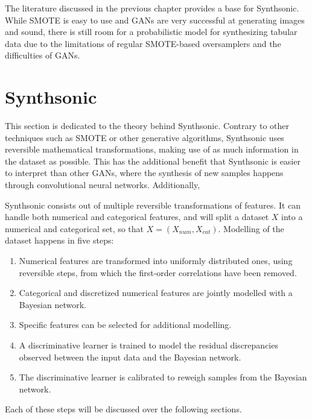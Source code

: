 The literature discussed in the previous chapter provides a base for Synthsonic. While SMOTE is easy to use and GANs are very successful at generating images and sound, there is still room for a probabilistic model for synthesizing tabular data due to the limitations of regular SMOTE-based oversamplers and the difficulties of GANs.

\section{Synthsonic}
This section is dedicated to the theory behind Synthsonic. Contrary to other techniques such as SMOTE or other generative algorithms, Synthsonic uses reversible mathematical transformations, making use of as much information in the dataset as possible. This has the additional benefit that Synthsonic is easier to interpret than other GANs, where the synthesis of new samples happens through convolutional neural networks. Additionally, 


Synthsonic consists out of multiple reversible transformations of features. It can handle both numerical and categorical features, and will split a dataset $X$ into a numerical and categorical set, so that $X = (X_{num}, X_{cat})$. Modelling of the dataset happens in five steps:

\begin{enumerate}
    \item Numerical features are transformed into uniformly distributed ones, using reversible steps, from which the first-order correlations have been removed.
    \item Categorical and discretized numerical features are jointly modelled with a Bayesian network.
    \item Specific features can be selected for additional modelling.
    \item A discriminative learner is trained to model the residual discrepancies observed between the input data and the Bayesian network.
    \item The discriminative learner is calibrated to reweigh samples from the Bayesian network.
\end{enumerate}

Each of these steps will be discussed over the following sections.

\section{}